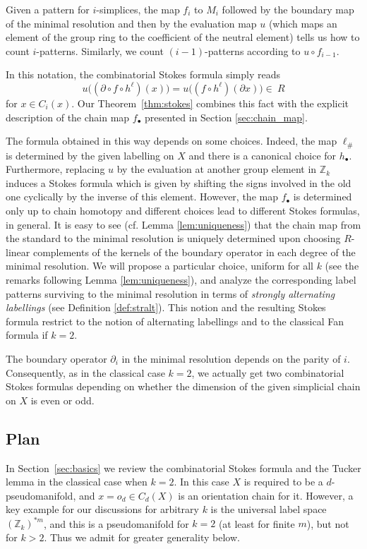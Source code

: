 \documentclass[11pt,a4paper,draft]{article}
\newcommand{\Z}{{\mathbb Z}}
\newcommand{\cmps}{\circ}
\theoremstyle{definition}
\begin{document}
Given a pattern for $i$-simplices,
the map $f_i$ to $M_i$ followed by the
boundary map of the minimal resolution and then by the evaluation map $u$
(which maps an element of the group ring to the coefficient of the
neutral element) tells us how to count $i$-patterns.
Similarly, we count $(i-1)$-patterns according to $u\circ f_{i-1}$.

In this notation, the combinatorial Stokes formula
simply reads
\[
    u \big( ( \partial \cmps f \cmps h^\ell)  (x) \big)  =   u \big(  ( f \cmps h^\ell)   (\partial x)  \big) \in \ R
\]
for $x\in C_i(x)$. Our Theorem~\ref{thm:stokes}
combines this fact  with the explicit description of the chain map $f_\bullet $
presented in Section \ref{sec:chain_map}.

The formula obtained in this way depends on some choices.
Indeed, the map $\ell_\# $ is determined by the given labelling on $X$
and there is a canonical choice for $h_\bullet$. Furthermore,
replacing $u$ by the evaluation at another group element in $\Z_k$
induces a Stokes formula which is given by shifting the signs
involved in the old one cyclically by the inverse of this element.
However, the map $f_\bullet$ is determined only up to chain
homotopy and different choices lead to
different Stokes formulas, in general.
It is easy to see (cf. Lemma \ref{lem:uniqueness}) that
the chain map from the standard to the minimal resolution is uniquely determined
upon choosing  $R$-linear complements of the kernels of the boundary operator
in each degree of the minimal resolution.
We will propose a particular choice,  uniform for all $k$
(see the remarks following Lemma \ref{lem:uniqueness}),
and analyze the corresponding label patterns surviving to the minimal resolution
in terms of {\em strongly alternating labellings} (see Definition \ref{def:stralt}). This notion and
the resulting Stokes formula
restrict to the notion of alternating labellings and to
the classical Fan formula if $k=2$.

The boundary operator $\partial_i$ in the minimal resolution depends on the parity of $i$.
Consequently, as in the classical case $k=2$,
we actually get two combinatorial Stokes formulas depending on whether the
dimension of the given simplicial chain on $X$ is even or odd.

\subsection{Plan}

In Section~\ref{sec:basics} we review the
combinatorial Stokes formula and the Tucker lemma in the classical
case when $k=2$. In this case $X$ is required to be a
$d$-pseudomanifold, and $x=o_d\in C_d(X)$ is an orientation chain for
it. However, a key example for our discussions for arbitrary $k$ is the
universal label space $(\Z_k)^{*m}$,
and this is a pseudomanifold for $k=2$ (at least for finite $m$), but not for
$k>2$. Thus we admit for greater generality below.
\end{document}
